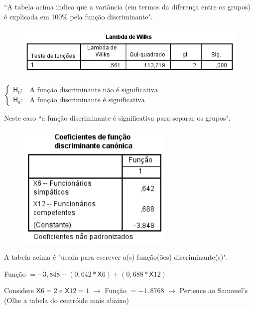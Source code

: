 				``A tabela acima indica que a variância (em termos da diferença entre os grupos) é explicada em 100\% pela função discriminante".

				\begin{figure}[H]
					\centering
					\includegraphics[height=2.5cm]{images/analise-discriminante_sumarizacao_lambda-de-wilks}
				\end{figure}

				$
					\begin{cases}

					\mathsf{H}_{0} : & \text{A função discriminante não é significativa} \\
					\mathsf{H}_{a} : & \text{A função discriminante é significativa}

					\end{cases}
				$

				\bigskip

				Neste caso ``a função discriminante é significativa para separar os grupos".

				\begin{figure}[H]
					\centering
					\includegraphics[height=6cm]{images/analise-discriminante_sumarizacao_coeficiente-de-funcao-d-c-}
				\end{figure}

				A tabela acima é "usada para escrever a(s) função(ões) discriminante(s)".

				\bigskip

				{\Large Função $= -3,848 + (0,642 * \mathsf{X}6) + (0,688 * \mathsf{X}12)$}

				\bigskip

				Considere $\mathsf{X}6 = 2$ e  $\mathsf{X}12 = 1$ $\rightarrow$ Função $= -1,8768$ $\rightarrow$ Pertence ao Samouel's (Olhe a tabela do centróide mais abaixo)

